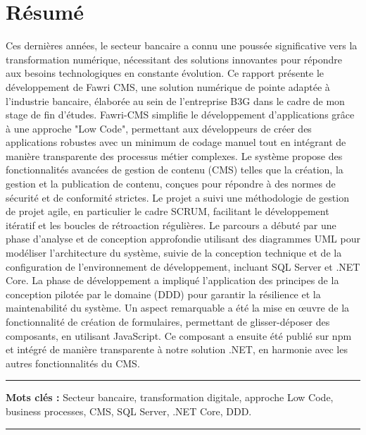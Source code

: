 \chapter*{Résumé}

\hspace{\parindent} Ces dernières années, le secteur bancaire a connu une poussée significative vers la transformation numérique, nécessitant des solutions innovantes pour répondre aux besoins technologiques en constante évolution. Ce rapport présente le développement de Fawri CMS, une solution numérique de pointe adaptée à l'industrie bancaire, élaborée au sein de l'entreprise B3G dans le cadre de mon stage de fin d'études. Fawri-CMS simplifie le développement d'applications grâce à une approche "Low Code", permettant aux développeurs de créer des applications robustes avec un minimum de codage manuel tout en intégrant de manière transparente des processus métier complexes. Le système propose des fonctionnalités avancées de gestion de contenu (CMS) telles que la création, la gestion et la publication de contenu, conçues pour répondre à des normes de sécurité et de conformité strictes. Le projet a suivi une méthodologie de gestion de projet agile, en particulier le cadre SCRUM, facilitant le développement itératif et les boucles de rétroaction régulières. Le parcours a débuté par une phase d’analyse et de conception approfondie utilisant des diagrammes UML pour modéliser l’architecture du système, suivie de la conception technique et de la configuration de l’environnement de développement, incluant SQL Server et .NET Core.
La phase de développement a impliqué l’application des principes de la conception pilotée par le domaine (DDD) pour garantir la résilience et la maintenabilité du système. Un aspect remarquable a été la mise en œuvre de la fonctionnalité de création de formulaires, permettant de glisser-déposer des composants, en utilisant JavaScript. Ce composant a ensuite été publié sur npm et intégré de manière transparente à notre solution .NET, en harmonie avec les autres fonctionnalités du CMS.

\noindent\rule[2pt]{\textwidth}{0.5pt}

{\textbf{Mots clés :}}
Secteur bancaire, transformation digitale, approche Low Code, business processes, CMS, SQL Server, .NET Core, DDD.
\\
\noindent\rule[2pt]{\textwidth}{0.5pt}